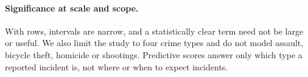 \paragraph{Significance at scale and scope.} With  rows, intervals are narrow, and a statistically clear term need not be large or useful. We also limit the study to four crime types and do not model assault, bicycle theft, homicide or shootings. Predictive scores answer only which type a reported incident is, not where or when to expect incidents.
